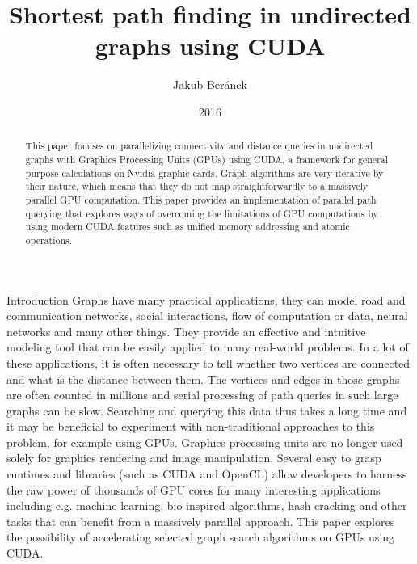\documentclass[a4paper,12pt,notitlepage,oneside]{article}
\title{Shortest path finding in undirected graphs using CUDA}
\author{Jakub Beránek}
\date{2016}
\begin{document}
\maketitle
\thispagestyle{empty}

\begin{abstract}
This paper focuses on parallelizing connectivity and distance queries in undirected graphs with Graphics Processing Units (GPUs) using CUDA,
a framework for general purpose calculations on Nvidia graphic cards.
Graph algorithms are very iterative by their nature, which means that they do not map straightforwardly to a massively parallel GPU
computation. This paper provides an implementation of parallel path querying that explores ways of overcoming the limitations of GPU computations by using
modern CUDA features such as unified memory addressing and atomic operations.
\end{abstract}

\begin{section}{Introduction}
Graphs have many practical applications, they can model road and communication networks, social interactions, flow of computation or data, neural networks and many
other things. They provide an effective and intuitive modeling tool that can be easily applied to many real-world problems.
In a lot of these applications, it is often necessary to tell whether two vertices are connected and what is the distance between them.
The vertices and edges in those graphs are often counted in millions and serial processing of path queries in such large graphs can be slow.
Searching and querying this data thus takes a long time and it may be beneficial to experiment with non-traditional approaches to
this problem, for example using GPUs. Graphics processing units are no longer used solely for graphics rendering and image manipulation.
Several easy to grasp runtimes and libraries (such as CUDA and OpenCL) allow developers to harness the raw power of thousands of GPU cores for many
interesting applications including e.g. machine learning, bio-inspired algorithms, hash cracking and other tasks that can benefit from a massively parallel approach.
This paper explores the possibility of accelerating selected graph search algorithms on GPUs using CUDA.
\end{section}
\end{document}

